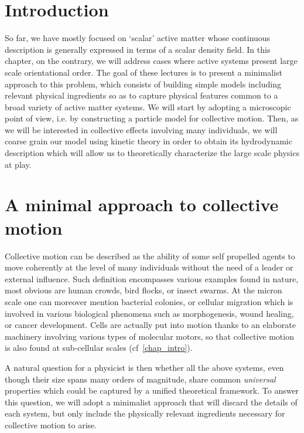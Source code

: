 
\section{Introduction}

So far, we have mostly focused on `scalar' active matter whose continuous description
is generally expressed in terms of a scalar density field.
In this chapter, on the contrary, we will address cases where active systems present large scale orientational order.
The goal of these lectures is to present a minimalist approach to this problem, which consists of building simple models 
including relevant physical ingredients so as to capture physical features common to a broad variety of active matter systems.
We will start by adopting a microscopic point of view, i.e. by constructing a particle model for collective motion.
Then, as we will be interested in collective effects involving many individuals, 
we will coarse grain our model using kinetic theory in order to obtain its hydrodynamic description
which will allow us to theoretically characterize the large scale physics at play.

\section{A minimal approach to collective motion} 

Collective motion can be described as the ability of some self propelled agents to move coherently at the level of many individuals without the need of a leader or external influence.
Such definition encompasses various examples found in nature, 
most obvious are human crowds, bird flocks, or insect swarms.
At the micron scale one can moreover mention bacterial colonies, or cellular migration which is involved in various biological phenomena such as morphogenesis, wound healing, or cancer development.
Cells are actually put into motion thanks to an elaborate machinery involving various types of molecular motors, so that collective motion is also found at sub-cellular scales (cf~\autoref{chap_intro}).

A natural question for a physicist is then whether all the above systems, even though their size spans many orders of magnitude, share common {\it universal} properties which could be captured by a unified theoretical framework.
To answer this question, we will adopt a minimalist approach that will discard the details of each system, but only include the physically relevant ingredients necessary for collective motion to arise.

